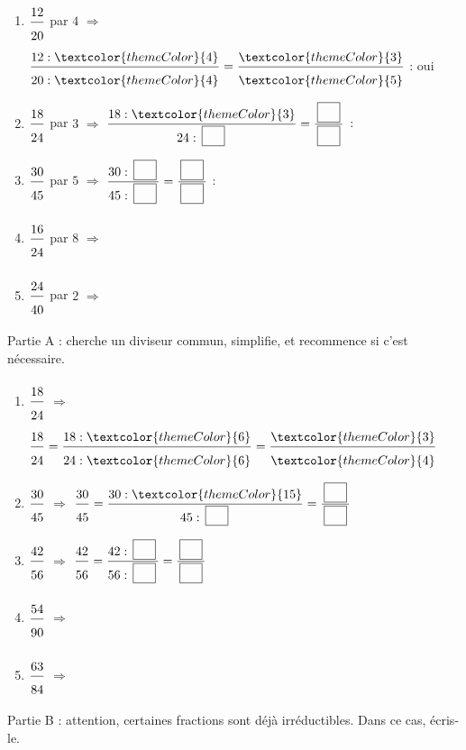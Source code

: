 \begin{enumerate}[leftmargin=*,align=parleft, label=\alph*), itemsep=7pt, start=6]
\item $\FA{12}{20}$ par $4$ \quad $\Longrightarrow$ \quad $\FA{12 : \textcolor{themeColor}{4}}{20 : \textcolor{themeColor}{4}}=\FA{\textcolor{themeColor}{3}}{\textcolor{themeColor}{5}}$ \quad : \quad \textcolor{themeColor}{oui}
\item $\FA{18}{24}$ par $3$ \quad $\Longrightarrow$ \quad $\FA{18 : \textcolor{themeColor}{3}}{24 : \CaseC}=\FA{\CaseC}{\CaseC}$ \quad : \quad \Case
\item $\FA{30}{45}$ par $5$ \quad $\Longrightarrow$ \quad $\FA{30 : \CaseC}{45 : \CaseC}=\FA{\CaseC}{\CaseC}$ \quad : \quad \Case
\item $\FA{16}{24}$ par $8$ \quad $\Longrightarrow$
\item $\FA{24}{40}$ par $2$ \quad $\Longrightarrow$
\end{enumerate}

\newpage

\vspace{10pt}


\medskip
\textcolor{themeColor}{Partie A} : cherche un diviseur commun, simplifie, et recommence si c'est nécessaire.

\begin{enumerate}[leftmargin=*,align=parleft, label=\alph*), itemsep=9pt]
\item $\FA{18}{24}$ \quad $\Longrightarrow$ \quad $\FA{18}{24}=\FA{18 : \textcolor{themeColor}{6}}{24 : \textcolor{themeColor}{6}}=\FA{\textcolor{themeColor}{3}}{\textcolor{themeColor}{4}}$
\item $\FA{30}{45}$ \quad $\Longrightarrow$ \quad $\FA{30}{45}=\FA{30 : \textcolor{themeColor}{15}}{45 : \CaseC}=\FA{\CaseC}{\CaseC}$
\item $\FA{42}{56}$ \quad $\Longrightarrow$ \quad $\FA{42}{56}=\FA{42 : \CaseC}{56 : \CaseC}=\FA{\CaseC}{\CaseC}$
\item $\FA{54}{90}$ \quad $\Longrightarrow$
\item $\FA{63}{84}$ \quad $\Longrightarrow$
\end{enumerate}

\medskip
\textcolor{themeColor}{Partie B} : attention, certaines fractions sont déjà irréductibles. Dans ce cas, écris-le.

